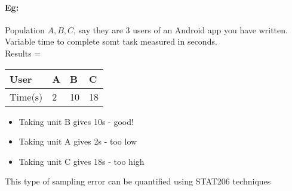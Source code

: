     \paragraph{Eg:} Population ${A, B, C}$, say they are 3 users of an Android
    app you have written. \\
    Variable time to complete somt task measured in seconds.\\

   Results =
    \begin{tabular}{l | l | l | l }
      User    & A & B  & C  \\
      \hline
      Time(s) & 2 & 10 & 18 \\
    \end{tabular}

    \begin{itemize}
      \item Taking unit B gives 10s - good!
      \item Taking unit A gives 2s - too low
      \item Taking unit C gives 18s - too high
    \end{itemize}
    This type of sampling error can be quantified using STAT206 techniques

